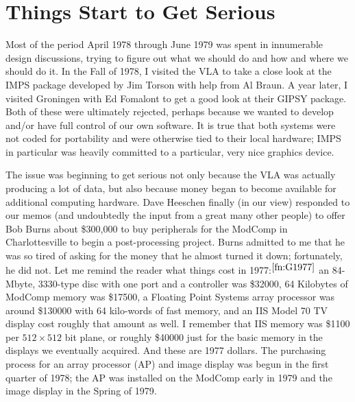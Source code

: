 \section{Things Start to Get Serious}

Most of the period April 1978 through June 1979 was spent in
innumerable design discussions, trying to figure out what we should do
and how and where we should do it.  In the Fall of 1978, I visited the
VLA to take a close look at the IMPS package developed by Jim Torson
with help from Al Braun.  A year later, I visited Groningen with Ed
Fomalont to get a good look at their GIPSY package.  Both of these
were ultimately rejected, perhaps because we wanted to develop and/or
have full control of our own software.  It is true that both systems
were not coded for portability and were otherwise tied to their local
hardware; IMPS in particular was heavily committed to a particular,
very nice graphics device.

The issue was beginning to get serious not only because the VLA was
actually producing a lot of data, but also because money began to
become available for additional computing hardware.  Dave Heeschen
finally (in our view) responded to our memos (and undoubtedly the
input from a great many other people) to offer Bob Burns about
\$300,000 to buy peripherals for the ModComp in Charlottesville to
begin a post-processing project.  Burns admitted to me that he was so
tired of asking for the money that he almost turned it down;
fortunately, he did not.  Let me remind the reader what things cost in
1977:$^{\ref{fn:G1977}}$ an 84-Mbyte, 3330-type disc with one port and
a controller was \$32000, 64 Kilobytes of ModComp memory was \$17500,
a Floating Point Systems array processor was around \$130000 with 64
kilo-words of fast memory, and an IIS Model 70 TV display cost roughly
that amount as well.  I remember that IIS memory was \$1100 per $512
\times 512$ bit plane, or roughly \$40000 just for the basic memory in
the displays we eventually acquired.  And these are 1977 dollars.  The
purchasing process for an array processor (AP) and image display was
begun in the first quarter of 1978; the AP was installed on the
ModComp early in 1979 and the image display in the Spring of 1979.


